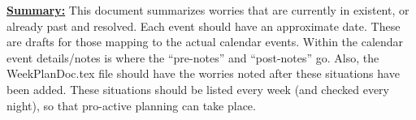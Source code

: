 \documentclass[11pt]{article}
\begin{document}
\underline{\textbf{Summary:}} This document summarizes worries
that are currently in existent,  or already past and resolved. 
Each event should have an approximate date. These
are drafts for those mapping to the actual calendar events. Within
the calendar event details/notes is where the ``pre-notes'' and
``post-notes'' go. Also, the WeekPlanDoc.tex file should have the worries
noted after these situations have been added. These situations should
be listed every week (and checked every night), so that pro-active
planning can take place.






\end{document}
